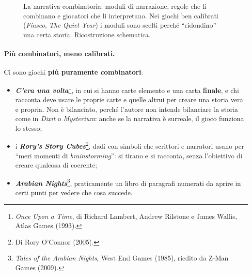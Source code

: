 \begin{figure}[htbp]
\centering
{}
\caption{La narrativa combinatoria: moduli di narrazione, regole che li combinano e giocatori che li
interpretano. Nei giochi ben calibrati (\emph{Fiasco}, \emph{The Quiet Year}) i moduli sono scelti
perché ``ridondino'' una certa storia. Ricostruzione schematica.}
\label{a16:fig:moduli}
\end{figure}

\paragraph{Più combinatori, meno calibrati.} Ci sono giochi \textbf{più puramente combinatori}:
\begin{itemize}
  \item \textbf{\emph{C'era una volta}}\footnote{\emph{Once Upon a Time}, di Richard Lambert,
        Andrew Rilstone e James Wallis, Atlas Games (1993).}, in cui si hanno carte elemento e una
        carta \textbf{finale}, e chi racconta deve usare le proprie carte e quelle altrui per creare
        una storia vera e propria. Non è bilanciato, perché l'autore non intende bilanciare la storia
        come in \emph{Dixit} o \emph{Mysterium}: anche se la narrativa è surreale, il gioco funziona
        lo stesso;
  \item i \textbf{\emph{Rory's Story Cubes}}\footnote{Di Rory O'Connor (2005).}, dadi con simboli
        che scrittori e narratori usano per ``meri momenti di \emph{brainstorming}'': si tirano e si
        racconta, senza l'obiettivo di creare qualcosa di coerente;
  \item \textbf{\emph{Arabian Nights}}\footnote{\emph{Tales of the Arabian Nights}, West End Games
        (1985), riedito da Z-Man Games (2009).}, praticamente un libro di paragrafi numerati da aprire
        in certi punti per vedere che cosa succede.
\end{itemize}

